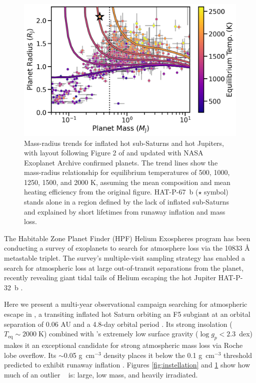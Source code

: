 \documentclass[linenumbers, twocolumn, trackchanges]{aastex631}
\newcommand{\hatpb}{\object{HAT-P-67 b}}
\begin{document}
\begin{figure}
  \includegraphics[width=\linewidth]{tf2018_fig2_update2023_HAT.png}
  \caption{Mass-radius trends for inflated hot sub-Saturns and hot Jupiters, with layout following Figure 2 of \citet{2018AJ....155..214T} and updated with NASA Exoplanet Archive confirmed planets.  The trend lines show the mass-radius relationship for equilibrium temperatures of 500, 1000, 1250, 1500, and 2000 K, assuming the mean composition and mean heating efficiency from the original figure.  HAT-P-67~b ($\star$ symbol) stands alone in a region defined by the lack of inflated sub-Saturns and explained by short lifetimes from runaway inflation and mass loss.}
  \label{fig:ThornFortUpdated}
\end{figure}

The Habitable Zone Planet Finder (HPF) Helium Exospheres program has been conducting a survey of exoplanets to search for atmosphere loss via the  10833 \AA~ metastable triplet.  The survey's multiple-visit sampling strategy has enabled a search for atmospheric loss at large out-of-transit separations from the planet, recently revealing giant tidal tails of Helium escaping the hot Jupiter HAT-P-32~b \citep{doi:10.1126/sciadv.adf8736}.

Here we present a multi-year observational campaign searching for atmospheric escape in , a transiting inflated hot Saturn orbiting an F5 subgiant at an orbital separation of 0.06 AU and a 4.8-day orbital period \citep{2017AJ....153..211Z}.  Its strong insolation ($T_\mathrm{eq}\sim2000\;$K) combined with 's extremely low surface gravity ($\log{g_p}<2.3$~dex) makes it an exceptional candidate for strong atmospheric mass loss via Roche lobe overflow.  Its $\sim$0.05 g~cm$^{-3}$ density places it below the 0.1 g~cm$^{-3}$ threshold predicted to exhibit runaway inflation \citep{2023ApJ...945L..36T}.  Figures \ref{fig:instellation} and \ref{fig:ThornFortUpdated} show how much of an outlier \hatpb~ is: large, low mass, and heavily irradiated.
\end{document}
